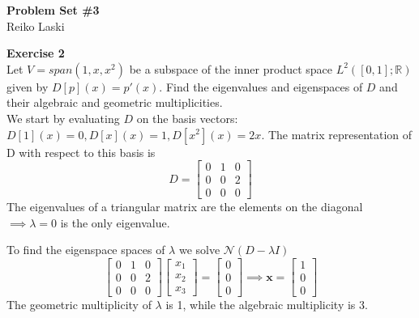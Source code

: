 \documentclass[letterpaper,12pt]{article}
\let\vec\mathbf
\theoremstyle{definition}
\begin{document}
\begin{flushleft}
  \textbf{\large{Problem Set \#3}} \\
  Reiko Laski
\end{flushleft}

\textbf{Exercise 2} \\
Let $V = span({1, x, x^2})$ be a subspace of the inner product space $L^2([0,1]; \mathbb{R})$ given by $D[p](x) = p'(x)$. Find the eigenvalues and eigenspaces of $D$ and their algebraic and geometric multiplicities.\\

We start by evaluating $D$ on the basis vectors: $D[1](x)=0, D[x](x)=1, D[x^2](x)=2x$. The matrix representation of D with respect to this basis is
\[ D =
\begin{bmatrix}
  0 & 1 & 0 \\
  0 & 0 & 2 \\
  0 & 0 & 0
\end{bmatrix}
\]
The eigenvalues of a triangular matrix are the elements on the diagonal $\implies \lambda = 0$ is the only eigenvalue.

To find the eigenspace spaces of $\lambda$ we solve $\mathscr{N}(D - \lambda I)$ \\
\[
\begin{bmatrix}
  0 & 1 & 0 \\
  0 & 0 & 2 \\
  0 & 0 & 0
\end{bmatrix}
\begin{bmatrix}
  x_1 \\ x_2 \\ x_3
\end{bmatrix}
=
\begin{bmatrix}
  0 \\ 0 \\ 0
\end{bmatrix}
\implies \vec{x} =
\begin{bmatrix}
  1 \\
  0 \\
  0
\end{bmatrix}
\]
The geometric multiplicity of $\lambda$ is 1, while the algebraic multiplicity is $3$.
\\
\end{document}
